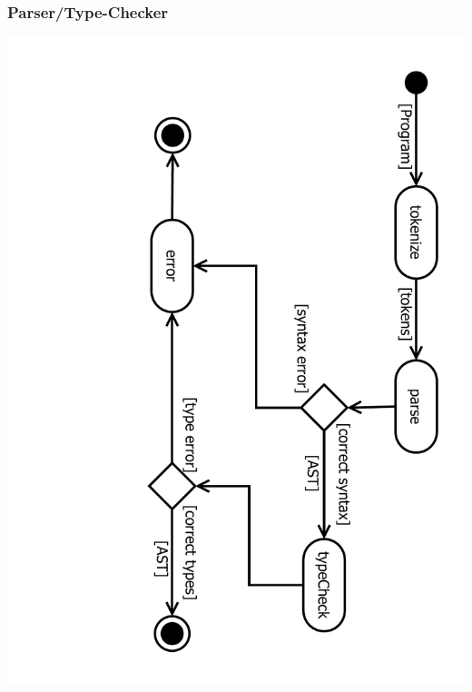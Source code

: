 \documentclass[10pt,a4paper,titlepage]{article}
\begin{document}
\subsubsection{Parser/Type-Checker}
\includegraphics[angle=90, scale=0.45]{images/AktivitaetParser.pdf}
\end{document}
